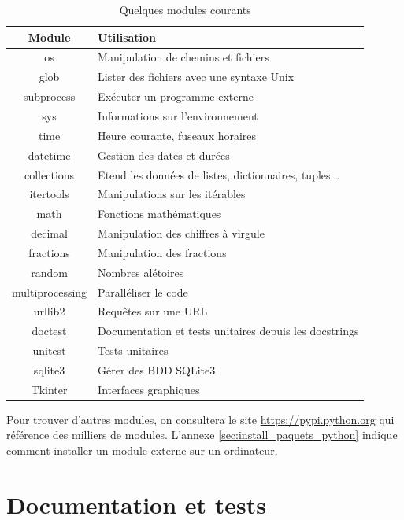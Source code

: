 \documentclass[12pt, a4paper]{article}
\begin{document}
\begin{table}[H]
	\begin{center}
		\begin{tabular}{|c|p{11cm}|}
			\hline
			\textbf{Module} & \textbf{Utilisation} \\
			\hline
			os & Manipulation de chemins et fichiers \\
			glob & Lister des fichiers avec une syntaxe Unix \\
			subprocess & Exécuter un programme externe \\
			sys & Informations sur l'environnement \\
			time & Heure courante, fuseaux horaires \\
			datetime & Gestion des dates et durées \\
			collections & Etend les données de listes, dictionnaires, tuples... \\
			itertools & Manipulations sur les itérables \\
			math & Fonctions mathématiques \\
			decimal & Manipulation des chiffres à virgule \\
			fractions & Manipulation des fractions \\
			random & Nombres alétoires \\
			multiprocessing & Paralléliser le code \\
			urllib2 & Requêtes sur une URL \\
			doctest & Documentation et tests unitaires depuis les docstrings \\
			unitest & Tests unitaires \\
			sqlite3 & Gérer des BDD SQLite3 \\
			Tkinter & Interfaces graphiques \\
			\hline
		\end{tabular}
		\caption{Quelques modules courants}
	\end{center}
\end{table}

Pour trouver d'autres modules, on consultera le site \url{https://pypi.python.org} qui référence des milliers de modules. L'annexe \ref{sec:install_paquets_python} indique comment installer un module externe sur un ordinateur.



\newpage
\part{Documentation et tests}
\label{sec:documentation_tests}
\end{document}
